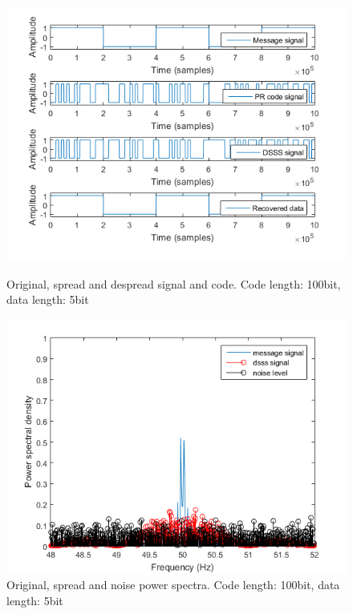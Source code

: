 \documentclass[12pt,a4paper]{article}
\begin{document}
	\begin{figure}
		\includegraphics[width=\textwidth]{images/code_cl100_dl5.png}
		\caption{Original, spread and despread signal and code. Code length: 100bit, data length: 5bit}
		\label{100:5}
		
		\includegraphics[width=\textwidth]{images/ft_cl_100_dl5.png}
		\caption{Original, spread and noise power spectra. Code length: 100bit, data length: 5bit}
		\label{ft:100:5}
	\end{figure}
\end{document}

